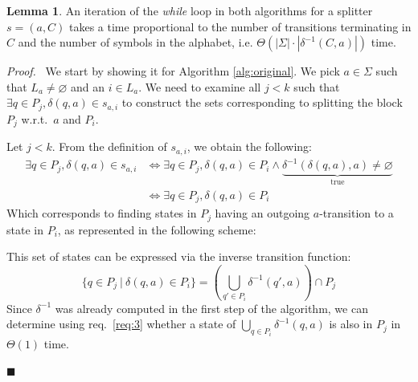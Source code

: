 \documentclass[12pt, a4 paper]{article}
\renewenvironment{proof}[1][Proof]{\begin{mdframed}[backgroundcolor=black!5, topline=false, rightline=false, bottomline=false, linecolor=black!15, linewidth=3pt]{\noindent\textit{#1.}\ }}{\noindent\par\hfill$\blacksquare$\end{mdframed}}
\theoremstyle{definition}
\newtheorem{lemma}{Lemma}
\begin{document}
\begin{lemma}\label{lem:time_iteration}
    An iteration of the \textit{while} loop in both algorithms for a splitter $s = (a, C)$ takes a time proportional to the number of transitions terminating in $C$ and the number of symbols in the alphabet, i.e. $\Theta\left(\left| \Sigma \right| \cdot \left| \delta^{-1}(C, a) \right| \right)$ time.
\end{lemma}
\begin{proof}
    We start by showing it for Algorithm \ref{alg:original}. We pick $a \in \Sigma$ such that $L_a \neq \varnothing$ and an $i \in L_a$. We need to examine all $j < k$ such that $\exists q \in P_j, \delta(q, a) \in s_{a,i}$ to construct the sets corresponding to splitting the block $P_j$ w.r.t.\ $a$ and $P_i$.

    Let $j < k$. From the definition of $s_{a,i}$, we obtain the following:
    \begin{align*}
        \exists q \in P_j, \delta(q, a) \in s_{a,i} &\iff \exists q \in P_j, \delta(q, a) \in P_i \land \underset{\text{true}}{\underbrace{\delta^{-1}(\delta(q, a), a) \neq \varnothing}} \\
        & \iff \exists q \in P_j, \delta(q, a) \in P_i
    \end{align*}
    Which corresponds to finding states in $P_j$ having an outgoing $a$-transition to a state in $P_i$, as represented in the following scheme:
    \begin{center}
    \end{center}
    This set of states can be expressed via the inverse transition function:
    $$ \{q \in P_j\ |\ \delta(q,a) \in P_i \} = \left( \bigcup_{q' \in P_i} \delta^{-1}(q', a)\right) \cap P_j $$
    Since $\delta^{-1}$ was already computed in the first step of the algorithm, we can determine using req.\ \ref{req:3} whether a state of $\bigcup_{q \in P_i} \delta^{-1}(q, a)$ is also in $P_j$ in $\Theta(1)$ time.
    

\end{proof}
\end{document}
